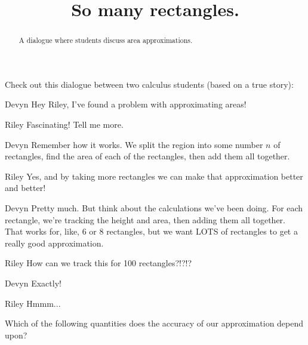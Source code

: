 \documentclass{ximera}
\title[Break-Ground:]{So many rectangles.}
\begin{document}
\begin{abstract}
A dialogue where students discuss area approximations.
\end{abstract}
\maketitle

Check out this dialogue between two calculus students (based on a true story):

\begin{dialogue}
\item[Devyn] Hey Riley, I've found a problem with approximating areas!
\item[Riley] Fascinating!  Tell me more.
\item[Devyn] Remember how it works.  We split the region into some number $n$ of 
				rectangles, find the area of each of the rectangles, then add
				them all together.
\item[Riley] Yes, and by taking more rectangles we can make that approximation
				better and better!
\item[Devyn] Pretty much.  But think about the calculations we've been doing.  
				For each rectangle, we're tracking the height and area, then
				adding them all together.  That works for, like, 6 or 8 
				rectangles, but we want LOTS of rectangles to get a really
				good approximation.
\item[Riley] How can we track this for 100 rectangles?!?!?
\item[Devyn] Exactly!
\item[Riley] Hmmm...
\end{dialogue}

\begin{problem}
	Which of the following quantities does the accuracy of our approximation depend upon?
	\begin{selectAll}
	\end{selectAll}
\end{problem}


\end{document}

